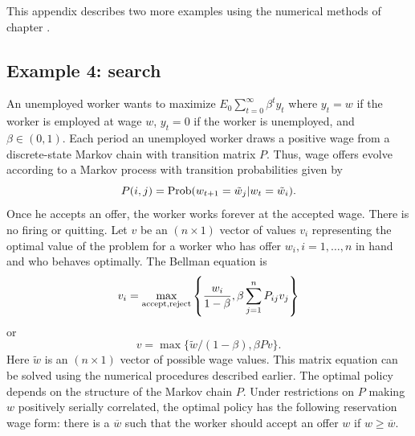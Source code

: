 \label{searchA}%
This appendix describes two more  examples  using the numerical
methods of chapter .

\subsection{Example 4: search}
 An unemployed worker
wants to maximize $E_0 \sum_{t=0}^\infty \beta^t y_t$
where $y_t=w$ if the worker is employed at wage $w$,
 $y_t= 0$ if the worker is unemployed, and $\beta \in (0,1)$.
  Each period an
unemployed worker draws a  positive wage from a discrete-state Markov chain
with transition matrix $P$. Thus,
  wage offers evolve according to a Markov process with transition
probabilities given by
$$ P(i,j) = {\rm Prob}(w_{t+1}=\tilde w_j \vert
             w_t = \tilde w_i).$$
Once he accepts an offer, the worker  works forever at
the accepted wage.  There is no firing or quitting.
Let $v$ be an $(n \times 1)$ vector of values $v_i$ representing
the optimal value of the problem for a worker who
has offer $w_i, i = 1,\ldots, n$ in hand and who behaves optimally.
The Bellman equation is
$$ v_i = \max_{\rm accept,  reject} \left\{ {w_i \over 1 - \beta},
  \beta \sum_{j=1}^n P_{ij} v_j  \right\}$$
or
$$ v = \max\{\tilde w / (1-\beta), \beta P v\}.$$
Here $\tilde w$ is an $(n \times 1)$ vector of possible wage
values. This matrix equation can be solved using the numerical
procedures described earlier.   The optimal policy
depends on the structure of the Markov chain $P$.   Under
restrictions on $P$ making $w$ positively
serially correlated, the optimal policy
has the following reservation wage form: there is a $\overline w$ such that
the worker should  accept an offer $w$
if $w \geq \overline w$.

